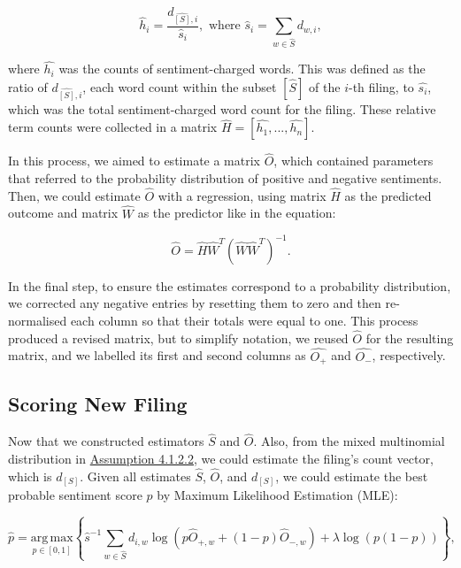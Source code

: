 \documentclass[logo,bsc,singlespacing,parskip]{infthesis}
\begin{document}
\begin{equation} \label{4.7}
\hat{h}_i = \frac{d_{\hat{[S]}, i}}{\hat{s}_i}, \text{ where } \hat{s}_i = \sum_{w \in \hat{S}} d_{w,i},
\end{equation}

where $\hat{h_i}$ was the counts of sentiment-charged words. This was defined as the ratio of $d_{\hat{[S]}, i}$, each word count within the subset $[\hat{S}]$ of the $i$-th filing, to $\hat{s_i}$, which was the total sentiment-charged word count for the filing. These relative term counts were collected in a matrix $\hat{H} = [\hat{h_1},...,\hat{h_n}]  $. 

In this process, we aimed to estimate a matrix $\hat{O}$, which contained parameters that referred to the probability distribution of positive and negative sentiments. Then, we could estimate $\hat{O}$ with a regression, using matrix $\hat{H}$ as the predicted outcome and matrix $\hat{W}$ as the predictor like in the equation:

\begin{equation} \label{4.8}
\hat{O} = \hat{H}\hat{W}^T (\hat{W}\hat{W}^T)^{-1}.
\end{equation}

In the final step, to ensure the estimates correspond to a probability distribution, we corrected any negative entries by resetting them to zero and then re-normalised each column so that their totals were equal to one. This process produced a revised matrix, but to simplify notation, we reused $\hat{O}$ for the resulting matrix, and we labelled its first and second columns as $\hat{O_+}$ and $ \hat{O_-}$, respectively. 

\subsection{Scoring New Filing}
\label{subsec:new_filings}
Now that we constructed estimators $\hat{S}$  and $\hat{O}$. Also, from the mixed multinomial distribution in \hyperref[subsubsec:assumption2]{Assumption 4.1.2.2}, we could estimate the filing’s count vector, which is $d_{[S]}$. Given all estimates $\hat{S}$, $\hat{O}$, and $d_{[S]}$, we could estimate the best probable sentiment score $p$ by Maximum Likelihood Estimation (MLE):

\begin{equation} \label{4.9}
\hat{p} = \underset{p \in [0,1]}{\mathrm{arg\,max}} \left\{ \hat{s}^{-1} \sum_{w \in \hat{S}} d_{i,w} \log ({p}\hat{O}_{+,w} + (1 - p)\hat{O}_{-,w}) + \lambda \log(p(1 - p)) \right\},
\end{equation}
\end{document}
